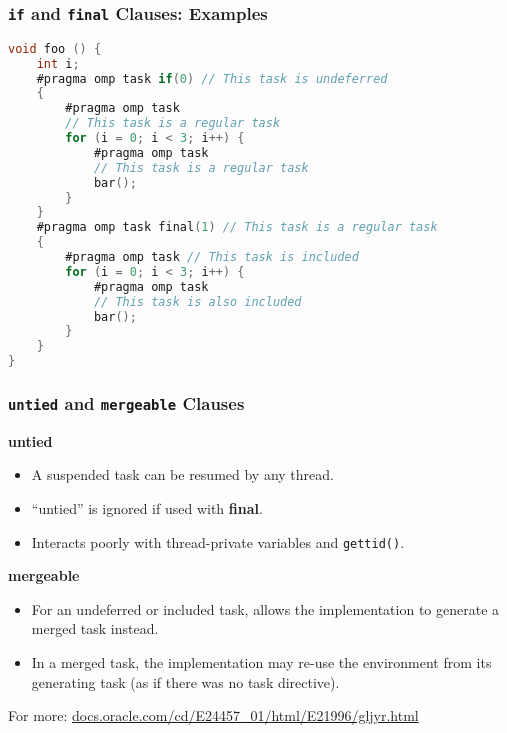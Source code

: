 \begin{frame}[fragile]
  \frametitle{{\tt if} and {\tt final} Clauses: Examples}

  \begin{lstlisting}[language=C,morekeywords={foreach,pragma,omp,parallel,single,nowait,task,untied,barrier,taskyield,mergeable,final,taskwait,critical}]
void foo () {
    int i;
    #pragma omp task if(0) // This task is undeferred
    {
        #pragma omp task
        // This task is a regular task
        for (i = 0; i < 3; i++) {
            #pragma omp task
            // This task is a regular task
            bar();
        }
    }
    #pragma omp task final(1) // This task is a regular task
    {
        #pragma omp task // This task is included
        for (i = 0; i < 3; i++) {
            #pragma omp task
            // This task is also included
            bar();
        }
    }
}
  \end{lstlisting}
\end{frame}

\begin{frame}
  \frametitle{{\tt untied} and {\tt mergeable} Clauses}

  
\begin{center}
  {\bf untied}
\end{center}
  \begin{itemize}
    \item A suspended task can be resumed by any thread.
    \item ``untied'' is ignored if used with {\bf final}.
    \item Interacts poorly with thread-private variables and {\tt gettid()}.
  \end{itemize}

\begin{center}
  {\bf mergeable}
\end{center}

  \begin{itemize}
    \item For an undeferred or included task,
    allows the implementation to generate a merged task instead.
    \item In a merged task, the implementation may re-use the environment from its generating task (as if there was no task directive).
  \end{itemize}

  For more: \url{docs.oracle.com/cd/E24457_01/html/E21996/gljyr.html}
  
\end{frame}

